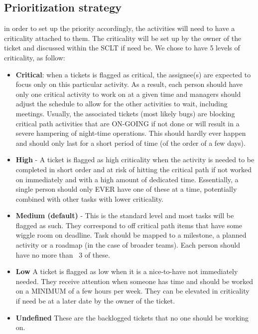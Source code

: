 \documentclass[SE,authoryear,toc]{lsstdoc}
\begin{document}
\subsection{Prioritization strategy}
in order to set up the priority accordingly, the activities will need to have a criticality attached to them.  
The criticality will be set up by the owner of the ticket and discussed within the SCLT if need be.  
We chose to have 5 levels of criticality, as follow:
\begin{itemize}
\item{\bf Critical}: when a tickets is flagged as critical, the assignee(s) are expected to focus only on this particular activity. 
As a result, each person should have only one critical activity to work on at a given time and managers should adjust the schedule to allow for the other activities to wait, including meetings. 
Usually, the associated tickets (most likely bugs) are blocking critical path activities that are ON-GOING if not done or will result in a severe hampering of night-time operations. 
This should hardly ever happen and should only last for a short period of time (of the order of a few days). 

\item{\bf High} - A ticket is flagged as high criticality when the activity is needed to be completed in short order and at risk of hitting the critical path if not worked on immediately and with a high amount of dedicated time. 
Essentially, a single person should only EVER have one of these at a time, potentially combined with other tasks with lower criticality. 

\item{\bf Medium (default)} - This is the standard level and most tasks will be flagged as such. 
They correspond to off critical path items that have some wiggle room on deadline. 
Task should be mapped to a milestone, a planned activity or a roadmap (in the case of broader teams).  
Each person should have no more than ~3 of these.

\item{\bf Low} A ticket is flagged as low when it is a nice-to-have not immediately needed. 
They receive attention when someone has time and  should be worked on a MINIMUM of a few hours per week. 
They can be elevated in criticality if need be at a later date by the owner of the ticket.  

\item{\bf Undefined} These are the backlogged tickets that no one should be working on.
\end{itemize}
\end{document}

